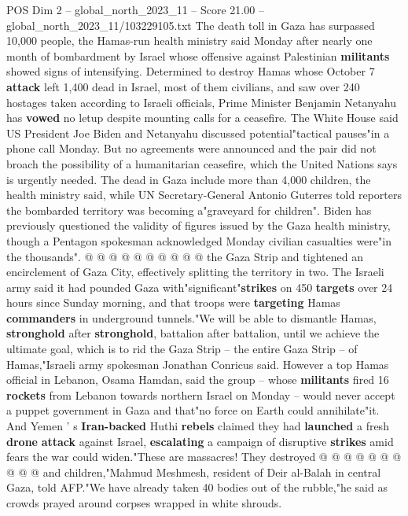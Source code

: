 \begin{textsample}{POS Dim 2 – global\_north\_2023\_11 – Score 21.00 – global\_north\_2023\_11/103229105.txt}  \label{ex:f2_pos_307}
The death toll in Gaza has surpassed 10,000 people, the Hamas-run health ministry said Monday after nearly one month of bombardment by Israel whose offensive against Palestinian \textbf{militants} showed signs of intensifying.
Determined to destroy Hamas whose October 7 \textbf{attack} left 1,400 dead in Israel, most of them civilians, and saw over 240 hostages taken according to Israeli officials, Prime Minister Benjamin Netanyahu has \textbf{vowed} no letup despite mounting calls for a ceasefire.
The White House said US President Joe Biden and Netanyahu discussed potential"tactical pauses"in a phone call Monday.
But no agreements were announced and the pair did not broach the possibility of a humanitarian ceasefire, which the United Nations says is urgently needed.
The dead in Gaza include more than 4,000 children, the health ministry said, while UN Secretary-General Antonio Guterres told reporters the bombarded territory was becoming a"graveyard for children".
Biden has previously questioned the validity of figures issued by the Gaza health ministry, though a Pentagon spokesman acknowledged Monday civilian casualties were"in the thousands". @ @ @ @ @ @ @ @ @ @ the Gaza Strip and tightened an encirclement of Gaza City, effectively splitting the territory in two.
The Israeli army said it had pounded Gaza with"significant"\textbf{strikes} on 450 \textbf{targets} over 24 hours since Sunday morning, and that troops were \textbf{targeting} Hamas \textbf{commanders} in underground tunnels."We will be able to dismantle Hamas, \textbf{stronghold} after \textbf{stronghold}, battalion after battalion, until we achieve the ultimate goal, which is to rid the Gaza Strip -- the entire Gaza Strip -- of Hamas,"Israeli army spokesman Jonathan Conricus said.
However a top Hamas official in Lebanon, Osama Hamdan, said the group -- whose \textbf{militants} fired 16 \textbf{rockets} from Lebanon towards northern Israel on Monday -- would never accept a puppet government in Gaza and that"no force on Earth could annihilate"it.
And Yemen ' s \textbf{Iran-backed} Huthi \textbf{rebels} claimed they had \textbf{launched} a fresh \textbf{drone} \textbf{attack} against Israel, \textbf{escalating} a campaign of disruptive \textbf{strikes} amid fears the war could widen."These are massacres!
They destroyed @ @ @ @ @ @ @ @ @ @ and children,"Mahmud Meshmesh, resident of Deir al-Balah in central Gaza, told AFP."We have already taken 40 bodies out of the rubble,"he said as crowds prayed around corpses wrapped in white shrouds.

\end{textsample}
